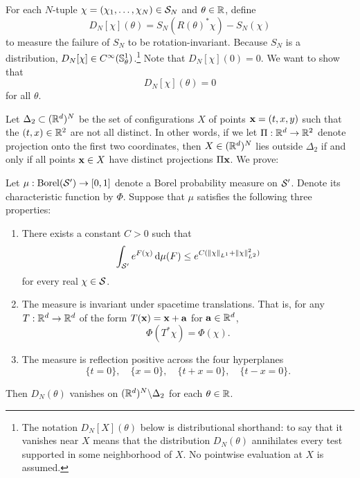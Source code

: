 For each $N$-tuple $\chi=(\chi_1,\dots,\chi_N)\in \mathcal{S}_N$
and $\theta\in \mathbb{R}$, define 
\begin{equation}
    D_N[\chi](\theta) = 
    S_N (R(\theta)^* \chi) -S_N(\chi)
\end{equation}
to measure the failure of $S_N$ to be rotation-invariant. 
Because $S_N$ is a distribution, $D_N[\chi] \in C^\infty(\mathbb{S}^1_\theta)$.\footnote{The notation $D_N[X](\theta)$ below is distributional shorthand: to say that it vanishes near $X$ means that the distribution $D_N(\theta)$ annihilates every test supported in some neighborhood of $X$. No pointwise evaluation at $X$ is assumed.} Note that $D_N[\chi](0)=0$. We want to show that
\begin{equation}
    D_N[\chi](\theta)=0
\end{equation}
for all $\theta$. 

Let $\Delta_2\subset (\mathbb{R}^d)^N$ be the set of configurations $X$ of points $\mathbf{x}=(t,x,y)$ such that the $(t,x)\in \mathbb{R}^2$ are not all distinct. In other words, if we let $\Pi:\mathbb{R}^d\to \mathbb{R}^2$ denote projection onto the first two coordinates, then $X\in (\mathbb{R}^d)^N$ lies outside $\Delta_2$ if and only if all points $\mathbf{x}\in X$ have distinct projections $\Pi \mathbf{x}$. 
We prove:
\begin{theorem}\label{thm:weak}
    Let $\mu:\operatorname{Borel}(\mathcal{S}')\to [0,1]$ denote a Borel probability measure on $\mathcal{S}'$. Denote its characteristic function by $\Phi$. Suppose that $\mu$ satisfies the following three properties:
    \begin{enumerate}[label=(\roman*)]
        \item  There exists a constant $C>0$ such that 
    \begin{equation}
        \int_{\mathcal{S}'} e^{F(\chi)} \,\mathrm{d} \mu(F) \leq e^{C(\lVert\chi\rVert_{L^1}+\lVert\chi\rVert_{L^2}^2)}
    \end{equation}
    for every real $\chi\in\mathcal{S}$. 
    \item  
    The measure is invariant under spacetime translations. That is, for any $T:\mathbb{R}^d\to \mathbb{R}^d$ of the form $T(\mathbf{x})=\mathbf{x}+\mathbf{a}$ for $\mathbf{a}\in \mathbb{R}^d$, 
    \begin{equation}
        \Phi(T^* \chi) = \Phi(\chi). 
    \end{equation}
    \item
    The measure is reflection positive across the four hyperplanes 
    \begin{equation}
        \{t=0\},\quad \{x=0\},\quad \{t+x=0\},\quad \{t-x=0\}.
    \end{equation}
    \end{enumerate}
    Then $D_N(\theta)$ vanishes on $(\mathbb{R}^d)^N\backslash \Delta_2$ for each $\theta\in \mathbb{R}$. 
\end{theorem}


